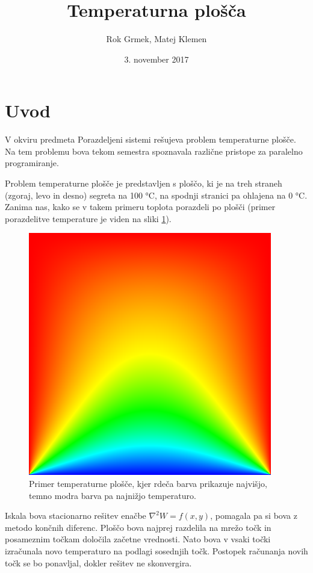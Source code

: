 \documentclass[a4paper,titlepage,11pt]{article}
\title{Temperaturna plošča}
\author{Rok Grmek, Matej Klemen}
\date{3. november 2017}
\begin{document}
\maketitle

\tableofcontents
\pagebreak

\section*{Uvod}

V okviru predmeta Porazdeljeni sistemi rešujeva problem temperaturne plošče. Na tem problemu bova tekom semestra spoznavala različne pristope za paralelno programiranje.

Problem temperaturne plošče je predstavljen s ploščo, ki je na treh straneh (zgoraj, levo in desno) segreta na 100 °C, na spodnji stranici pa ohlajena na 0 °C. Zanima nas, kako se v takem primeru toplota porazdeli po plošči (primer porazdelitve temperature je viden na sliki \ref{primer-temperaturne-plosce}).

\begin{figure}[H]
\begin{center}
\includegraphics[scale=0.6]{primer-temperaturne-plosce.png}
\caption{Primer temperaturne plošče, kjer rdeča barva prikazuje najvišjo, temno modra barva pa najnižjo temperaturo.}
\label{primer-temperaturne-plosce}
\end{center}
\vspace{-25pt}
\end{figure}

Iskala bova stacionarno rešitev enačbe \(\nabla^2 W = f(x, y)\), pomagala pa si bova z metodo končnih diferenc. Ploščo bova najprej razdelila na mrežo točk in posameznim točkam določila začetne vrednosti. Nato bova v vsaki točki izračunala novo temperaturo na podlagi sosednjih točk. Postopek računanja novih točk se bo ponavljal, dokler rešitev ne skonvergira.
\end{document}
